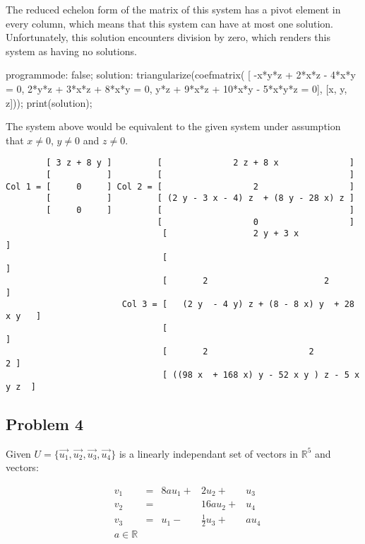 \documentclass[11pt]{article}
\begin{document}
The reduced echelon form of the matrix of this system has a pivot element in
every column, which means that this system can have at most one solution.
Unfortunately, this solution encounters division by zero, which renders this
system as having no solutions.

\begin{maxima}
programmode: false;
solution: triangularize(coefmatrix(
[ -x*y*z + 2*x*z - 4*x*y = 0,
  2*y*z + 3*x*z + 8*x*y = 0,
  y*z + 9*x*z + 10*x*y - 5*x*y*z = 0],
  [x, y, z]));
print(solution);
\end{maxima}

The system above would be equivalent to the given system under assumption that
$x \neq 0$, $y \neq 0$ and $z \neq 0$.

\begin{verbatim}
        [ 3 z + 8 y ]         [              2 z + 8 x              ]
        [           ]         [                                     ]
Col 1 = [     0     ] Col 2 = [                  2                  ]
        [           ]         [ (2 y - 3 x - 4) z  + (8 y - 28 x) z ]
        [     0     ]         [                                     ]
                              [                  0                  ]
                               [                 2 y + 3 x                  ]
                               [                                            ]
                               [       2                       2            ]
                       Col 3 = [   (2 y  - 4 y) z + (8 - 8 x) y  + 28 x y   ] 
                               [                                            ]
                               [       2                    2             2 ]
                               [ ((98 x  + 168 x) y - 52 x y ) z - 5 x y z  ]
\end{verbatim}
\subsection{Problem 4}
\label{sec-1-4}
Given $U = \{\vec{u_1}, \vec{u_2}, \vec{u_3}, \vec{u_4}\}$ is a linearly
independant set of vectors in $\mathbb{R}^5$ and vectors:

\begin{equation*}
  \begin{alignedat}{4}
    & v_1 & {}={} & 8au_1 {}+{} & 2u_2 {}+{}   & u_3 \\
    & v_2 & {}={} &             & 16au_2 {}+{}                        & u_4 \\
    & v_3 & {}={} & u_1 {}-{}                  & \frac{1}{2}u_3 {}+{} & au_4 \\
    & a \in \mathbb{R}
  \end{alignedat}
\end{equation*}
\end{document}
